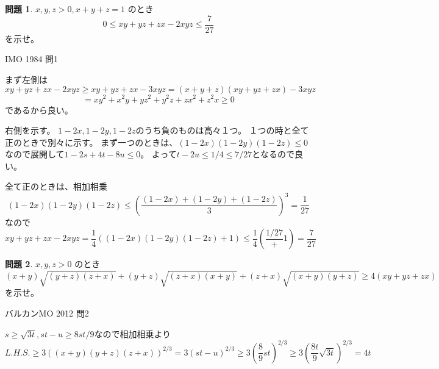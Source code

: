 \documentclass[uplatex, a5paper]{jsarticle}
\makeatletter
\theoremstyle{definition}
\newtheorem{prob}{問題}
\renewenvironment{proof}[1][\proofname]{
  \pushQED{\qed}%
  \normalfont \topsep6\p@\@plus6\p@\relax
  \trivlist
  \item[\hskip\labelsep
    #1\@addpunct{\textbf{.}}]\ignorespaces
}{%
  \popQED\endtrivlist\@endpefalse
}
\providecommand{\proofname}{証明}
\def\qed{\hfill $\Box$}
\makeatother
\begin{document}
\newpage

\begin{prob}
  \(x,y,z>0,x+y+z=1\)
  のとき
  \[
  0 \leq xy+yz+zx-2xyz \leq \frac{7}{27}
  \]
  を示せ。
  \begin{flushright}
    IMO 1984 問1
  \end{flushright}
\end{prob}


\begin{proof}
  まず左側は
  \[
  xy+yz+zx-2xyz \geq xy+yz+zx-3xyz = (x+y+z)(xy+yz+zx)-3xyz
  \]
  \[
  = xy^2+x^2y+yz^2+y^2z+zx^2+z^2x \geq 0
  \]
  であるから良い。

  右側を示す。
  \(1-2x,1-2y,1-2z\)のうち負のものは高々１つ。
  １つの時と全て正のときで別々に示す。
  まず一つのときは、\((1-2x)(1-2y)(1-2z)\leq 0\)なので展開して\(1-2s+4t-8u \leq 0\)。
  よって\(t-2u \leq 1/4 \leq 7/27\)となるので良い。

  全て正のときは、相加相乗
  \[
  (1-2x)(1-2y)(1-2z) \leq \left( \frac{(1-2x)+(1-2y)+(1-2z) }{3} \right) ^3 = \frac{1}{27}
  \]
  なので
  \[
  xy+yz+zx-2xyz
  = \frac{1}{4}\left( (1-2x)(1-2y)(1-2z) +1 \right) \leq \frac{1}{4}\left( \frac{1/27} +1 \right)
  = \frac{7}{27}
  \]
\end{proof}











\newpage

\begin{prob}
  \(x,y,z > 0\)
  のとき
  \[
  (x+y)\sqrt{(y+z)(z+x)} + (y+z)\sqrt{(z+x)(x+y)} + (z+x)\sqrt{(x+y)(y+z)} \geq 4(xy+yz+zx)
  \]
  を示せ。
  \begin{flushright}
    バルカンMO 2012 問2
  \end{flushright}
\end{prob}


\begin{proof}
  \(s \geq \sqrt{3t} , st-u \geq 8st/9\)なので相加相乗より
  \[
  L.H.S. \geq 3\left( (x+y)(y+z)(z+x) \right) ^{2/3}
  = 3(st-u)^{2/3} \geq 3\left( \frac{8}{9}st \right) ^{2/3}
  \geq 3\left( \frac{8t}{9}\sqrt{3t} \right) ^{2/3} = 4t
  \]
\end{proof}
\end{document}
